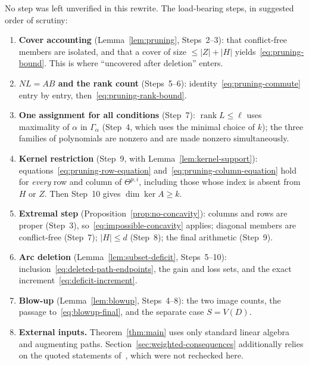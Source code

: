 \documentclass[11pt]{article}
\theoremstyle{remark}
\newcommand{\abs}[1]{\lvert #1\rvert}
\DeclareMathOperator{\rank}{rank}
\begin{document}
No step was left unverified in this rewrite. The load-bearing steps, in
suggested order of scrutiny:
\begin{enumerate}[leftmargin=*]
\item \textbf{Cover accounting} (Lemma~\ref{lem:pruning}, Steps~2--3): that
conflict-free members are isolated, and that a cover of size
$\le\abs Z+\abs H$ yields~\eqref{eq:pruning-bound}. This is where ``uncovered
after deletion'' enters.
\item \textbf{$NL=AB$ and the rank count} (Steps~5--6):
identity~\eqref{eq:pruning-commute} entry by entry,
then~\eqref{eq:pruning-rank-bound}.
\item \textbf{One assignment for all conditions} (Step~7): $\rank L\le\ell$
uses maximality of $\alpha$ in $\Gamma_\alpha$ (Step~4, which uses the minimal
choice of $k$); the three families of polynomials are nonzero and are made
nonzero simultaneously.
\item \textbf{Kernel restriction} (Step~9, with
Lemma~\ref{lem:kernel-support}): equations~\eqref{eq:pruning-row-equation}
and~\eqref{eq:pruning-column-equation} hold for \emph{every} row and column of
$\Theta^{p,i}$, including those whose index is absent from $H$ or $Z$. Then
Step~10 gives $\dim\ker A\ge k$.
\item \textbf{Extremal step} (Proposition~\ref{prop:no-concavity}): columns
and rows are proper (Step~3), so~\eqref{eq:impossible-concavity} applies;
diagonal members are conflict-free (Step~7); $\abs H\le d$ (Step~8); the final
arithmetic (Step~9).
\item \textbf{Arc deletion} (Lemma~\ref{lem:subset-deficit}, Steps~5--10):
inclusion~\eqref{eq:deleted-path-endpoints}, the gain and loss sets, and the
exact increment~\eqref{eq:deficit-increment}.
\item \textbf{Blow-up} (Lemma~\ref{lem:blowup}, Steps~4--8): the two image
counts, the passage to~\eqref{eq:blowup-final}, and the separate case
$S=V(D)$.
\item \textbf{External inputs.} Theorem~\ref{thm:main} uses only standard
linear algebra and augmenting paths. Section~\ref{sec:weighted-consequences}
additionally relies on the quoted statements of~\cite{Seacrest2015}, which
were not rechecked here.
\end{enumerate}



\end{document}
